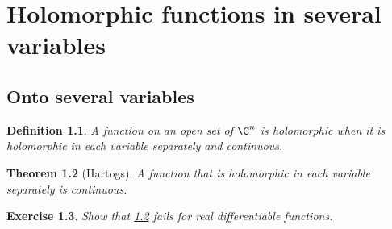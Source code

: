 \newtheorem{thm}{Theorem}[section]
\newtheorem{prop}[thm]{Proposition}
\newtheorem{defn}[thm]{Definition}
\newtheorem{exbox}[thm]{Exercise}

\chapter{Holomorphic functions in several variables}
\section{Onto several variables}

\begin{defn}
A function on an open set of $\C^n$ is \emph{holomorphic} when it is
holomorphic in each variable separately and continuous.
\end{defn}

\begin{thm}[Hartogs]
\label{thm:hartogs}
A function that is holomorphic in each variable separately is continuous.
\end{thm}

\begin{exbox}
Show that \ref{thm:hartogs} fails for real differentiable functions.
\end{exbox}

